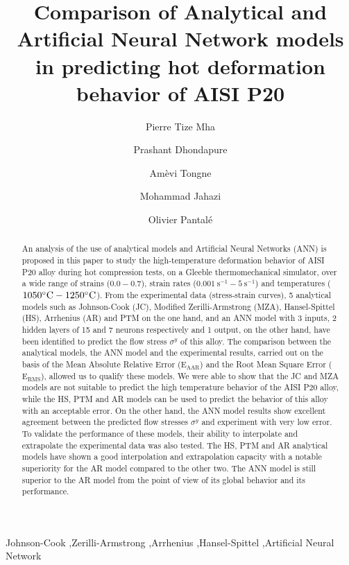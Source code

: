 \documentclass[twoside,english,1p,final,sort&compress]{elsarticle}
\theoremstyle{plain}
\DeclareRobustCommand{\RMSE}{\text{E}_\text{RMS}}
\DeclareRobustCommand{\AARE}{\text{E}_\text{AAR}}
\DeclareRobustCommand{\ps}{\text{s}^{-1}}
\begin{document}
\begin{frontmatter}

\title{Comparison of Analytical and Artificial Neural Network models in predicting hot deformation behavior of AISI P20}

\author[LGP]{Pierre Tize Mha}
\author[ETS]{Prashant Dhondapure}
\author[LGP]{Amèvi Tongne}
\author[ETS]{Mohammad Jahazi}
\author[LGP]{Olivier Pantalé}


\address[LGP]{Laboratoire Génie de Production, INP/ENIT, Université de Toulouse, 47 Av d'Azereix, Tarbes, 65016, France}
\address[ETS]{École de Technologie Supérieure, 1100 Rue Notre Dame O, Montréal, QC H3C 1K3, Canada}

\begin{abstract}
An analysis of the use of analytical models and Artificial Neural Networks (ANN) is proposed in this paper to study the high-temperature deformation behavior of AISI P20 alloy during hot compression tests, on a Gleeble thermomechanical simulator, over a wide range of strains ($0.0-0.7$), strain rates ($0.001~\ps-5~\ps$) and temperatures ($1050\celsius-1250\celsius$).
From the experimental data (stress-strain curves), 5 analytical models such as Johnson-Cook (JC), Modified Zerilli-Armstrong (MZA), Hansel-Spittel (HS), Arrhenius (AR) and PTM on the one hand, and an ANN model with 3 inputs, 2 hidden layers of 15 and 7 neurons respectively and 1 output, on the other hand, have been identified to predict the flow stress $\sigma^y$ of this alloy.
The comparison between the analytical models, the ANN model and the experimental results, carried out on the basis of the Mean Absolute Relative Error ($\AARE$) and the Root Mean Square Error ($\RMSE$), allowed us to qualify these models.
We were able to show that the JC and MZA models are not suitable to predict the high temperature behavior of the AISI P20 alloy, while the HS, PTM and AR models can be used to predict the behavior of this alloy with an acceptable error.
On the other hand, the ANN model results show excellent agreement between the predicted flow stresses $\sigma^y$ and experiment with very low error.
To validate the performance of these models, their ability to interpolate and extrapolate the experimental data was also tested.
The HS, PTM and AR analytical models have shown a good interpolation and extrapolation capacity with a notable superiority for the AR model compared to the other two.
The ANN model is still superior to the AR model from the point of view of its global behavior and its performance.
\end{abstract}

\begin{keyword}
Johnson-Cook \sep Zerilli-Armstrong \sep Arrhenius \sep Hansel-Spittel \sep Artificial Neural Network
\end{keyword}

\end{frontmatter}
\linenumbers
\end{document}
